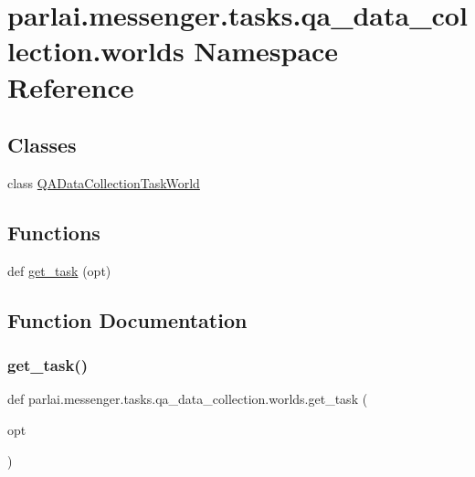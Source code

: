 \hypertarget{namespaceparlai_1_1messenger_1_1tasks_1_1qa__data__collection_1_1worlds}{}\section{parlai.\+messenger.\+tasks.\+qa\+\_\+data\+\_\+collection.\+worlds Namespace Reference}
\label{namespaceparlai_1_1messenger_1_1tasks_1_1qa__data__collection_1_1worlds}
\subsection*{Classes}
\begin{DoxyCompactItemize}
\item 
class \hyperlink{classparlai_1_1messenger_1_1tasks_1_1qa__data__collection_1_1worlds_1_1QADataCollectionTaskWorld}{Q\+A\+Data\+Collection\+Task\+World}
\end{DoxyCompactItemize}
\subsection*{Functions}
\begin{DoxyCompactItemize}
\item 
def \hyperlink{namespaceparlai_1_1messenger_1_1tasks_1_1qa__data__collection_1_1worlds_ae3e33a78819bd2723565943617193e10}{get\+\_\+task} (opt)
\end{DoxyCompactItemize}


\subsection{Function Documentation}
\mbox{\label{namespaceparlai_1_1messenger_1_1tasks_1_1qa__data__collection_1_1worlds_ae3e33a78819bd2723565943617193e10}} 
\subsubsection{\texorpdfstring{get\+\_\+task()}{get\_task()}}
{\footnotesize\ttfamily def parlai.\+messenger.\+tasks.\+qa\+\_\+data\+\_\+collection.\+worlds.\+get\+\_\+task (\begin{DoxyParamCaption}\item[{}]{opt }\end{DoxyParamCaption})}



